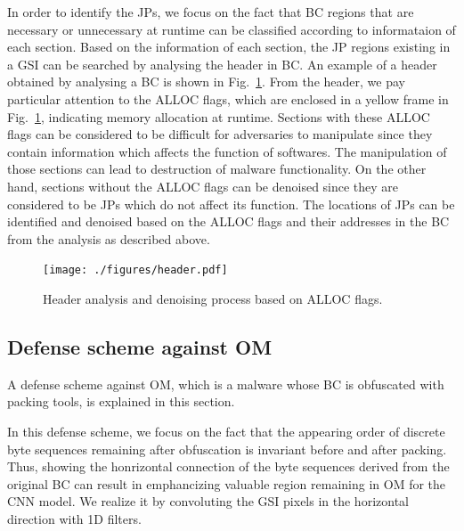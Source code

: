 \documentclass{ieeeaccess}
\newcommand{\myfigurename}{Fig.}
\begin{document}
In order to identify the JPs, we focus on the fact that BC regions that are necessary or unnecessary at runtime can be classified according to informataion of each section.
Based on the information of each section, the JP regions existing in a GSI can be searched by analysing the header in BC.
An example of a header obtained by analysing a BC is shown in \myfigurename~\ref{fig:header}.
From the header, we pay particular attention to the ALLOC flags, which are enclosed in a yellow frame in \myfigurename~\ref{fig:header}, indicating memory allocation at runtime.
Sections with these ALLOC flags can be considered to be difficult for adversaries to manipulate since they contain information which affects the function of softwares.
The manipulation of those sections can lead to destruction of malware functionality. 
On the other hand, sections without the ALLOC flags can be denoised since they are considered to be JPs which do not affect its function.
The locations of JPs can be identified and denoised based on the ALLOC flags and their addresses in the BC from the analysis as described above.
\begin{figure}[t]
 \centering
 \texttt{[image: ./figures/header.pdf]}
	\caption{Header analysis and denoising process based on ALLOC flags.} 
 \label{fig:header}
\end{figure}

\subsection{Defense scheme against OM}
A defense scheme against OM, which is a malware whose BC is obfuscated with packing tools, is explained in this section.

In this defense scheme, we focus on the fact that the appearing order of discrete byte sequences remaining after obfuscation is invariant before and after packing.
Thus, showing the honrizontal connection of the byte sequences derived from the original BC can result in emphancizing valuable region remaining in OM for the CNN model.
We realize it by convoluting the GSI pixels in the horizontal direction with 1D filters.
\end{document}
